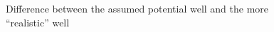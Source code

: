 \documentclass[authoryearcitations]{UoYCSproject}
\begin{document}
\begin{figure}[h]
  \centering
  \hspace{0.5 in}
    \caption{Difference between the assumed potential well and the more ``realistic'' well}
    \label{potWells}
\end{figure}
\end{document}
